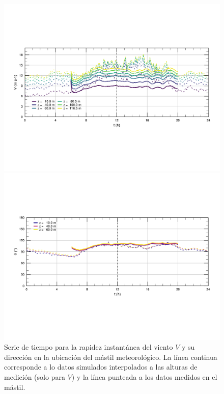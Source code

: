 \begin{figure}[H]
	\centering
	\includegraphics[width=1\linewidth,trim={9mm 63mm 10mm 55mm},clip]{Imagenes/06/hov/ts_v}%
	
	\includegraphics[width=1\linewidth,trim={12mm 55mm 10mm 55mm},clip]{Imagenes/06/hov/ts_o}%
	\caption{Serie de tiempo para la rapidez instantánea del viento $V$ y su dirección en la ubicación del mástil meteorológico. La línea continua corresponde a lo datos simulados interpolados a las alturas de medición (solo para $V$) y la línea punteada a los datos medidos en el mástil.}
	\label{fig:06_hov_ts}
\end{figure}



